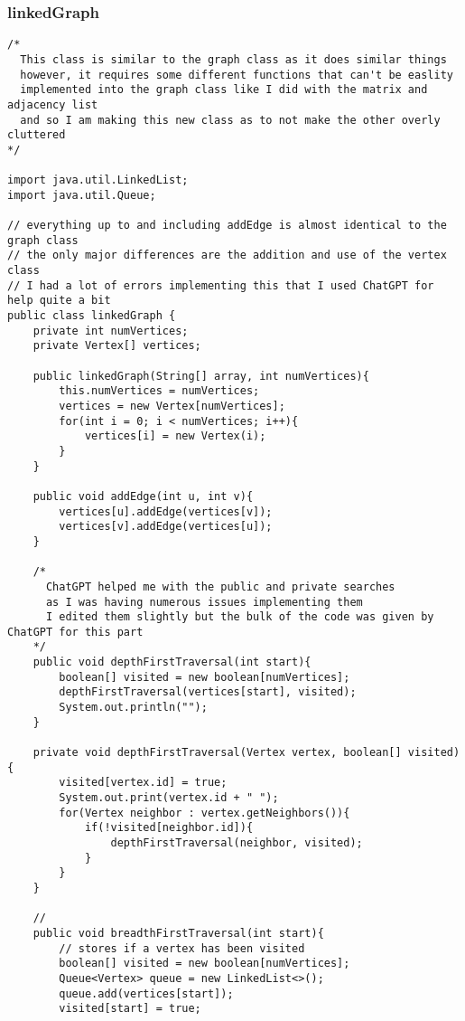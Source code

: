 \documentclass[10pt]{article}
\begin{document}
\subsubsection{linkedGraph}
\lstset{numbers=left, numberstyle=\tiny, stepnumber=1, numbersep=5pt, basicstyle=\footnotesize\ttfamily}
\begin{lstlisting}[frame=single, ]  
/*
  This class is similar to the graph class as it does similar things  
  however, it requires some different functions that can't be easlity
  implemented into the graph class like I did with the matrix and adjacency list
  and so I am making this new class as to not make the other overly cluttered
*/

import java.util.LinkedList;
import java.util.Queue;

// everything up to and including addEdge is almost identical to the graph class
// the only major differences are the addition and use of the vertex class
// I had a lot of errors implementing this that I used ChatGPT for help quite a bit
public class linkedGraph {
    private int numVertices;
    private Vertex[] vertices;

    public linkedGraph(String[] array, int numVertices){
        this.numVertices = numVertices;
        vertices = new Vertex[numVertices];
        for(int i = 0; i < numVertices; i++){
            vertices[i] = new Vertex(i);
        }
    }

    public void addEdge(int u, int v){
        vertices[u].addEdge(vertices[v]);
        vertices[v].addEdge(vertices[u]);
    }

    /*
      ChatGPT helped me with the public and private searches
      as I was having numerous issues implementing them
      I edited them slightly but the bulk of the code was given by ChatGPT for this part
    */
    public void depthFirstTraversal(int start){
        boolean[] visited = new boolean[numVertices];
        depthFirstTraversal(vertices[start], visited);
        System.out.println("");
    }

    private void depthFirstTraversal(Vertex vertex, boolean[] visited){
        visited[vertex.id] = true;
        System.out.print(vertex.id + " ");
        for(Vertex neighbor : vertex.getNeighbors()){
            if(!visited[neighbor.id]){
                depthFirstTraversal(neighbor, visited);
            }
        }
    }

    // 
    public void breadthFirstTraversal(int start){
        // stores if a vertex has been visited
        boolean[] visited = new boolean[numVertices];
        Queue<Vertex> queue = new LinkedList<>();
        queue.add(vertices[start]);
        visited[start] = true;


\end{lstlisting}
\end{document}
